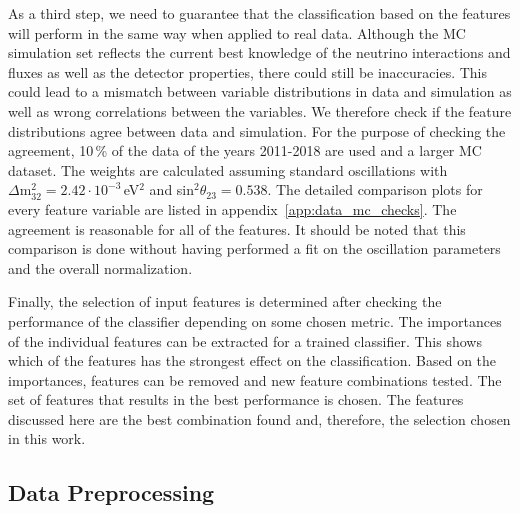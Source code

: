 As a third step, we need to guarantee that the classification based on the features will perform in the same way when applied to real data.
Although the MC simulation set reflects the current best knowledge of the neutrino interactions and fluxes as well as the detector properties, there could still be inaccuracies.
This could lead to a mismatch between variable distributions in data and simulation as well as wrong correlations between the variables.
We therefore check if the feature distributions agree between data and simulation.
For the purpose of checking the agreement, 10\,\% of the data of the years 2011-2018 are used and a larger MC dataset.
The weights are calculated assuming standard oscillations with $\Delta\mathrm{m}^2_{32}=2.42\cdot10^{-3}$\,eV$^2$ and sin$^2\theta_{23}=0.538$.
The detailed comparison plots for every feature variable are listed in appendix~\ref{app:data_mc_checks}.
The agreement is reasonable for all of the features.
It should be noted that this comparison is done without having performed a fit on the oscillation parameters and the overall normalization.

Finally, the selection of input features is determined after checking the performance of the classifier depending on some chosen metric.
The importances of the individual features can be extracted for a trained classifier.
This shows which of the features has the strongest effect on the classification.
Based on the importances, features can be removed and new feature combinations tested.
The set of features that results in the best performance is chosen.
The features discussed here are the best combination found and, therefore, the selection chosen in this work.


\subsection{Data Preprocessing}

